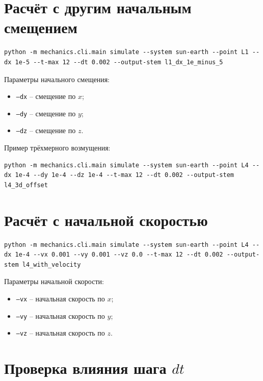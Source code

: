 \documentclass[a4paper,12pt]{article}
\begin{document}
\section{Расчёт с другим начальным смещением}

\begin{lstlisting}
python -m mechanics.cli.main simulate --system sun-earth --point L1 --dx 1e-5 --t-max 12 --dt 0.002 --output-stem l1_dx_1e_minus_5
\end{lstlisting}

Параметры начального смещения:

\begin{itemize}[leftmargin=1.2cm]
  \item \texttt{--dx} -- смещение по $x$;
  \item \texttt{--dy} -- смещение по $y$;
  \item \texttt{--dz} -- смещение по $z$.
\end{itemize}

Пример трёхмерного возмущения:

\begin{lstlisting}
python -m mechanics.cli.main simulate --system sun-earth --point L4 --dx 1e-4 --dy 1e-4 --dz 1e-4 --t-max 12 --dt 0.002 --output-stem l4_3d_offset
\end{lstlisting}

\section{Расчёт с начальной скоростью}

\begin{lstlisting}
python -m mechanics.cli.main simulate --system sun-earth --point L4 --dx 1e-4 --vx 0.001 --vy 0.001 --vz 0.0 --t-max 12 --dt 0.002 --output-stem l4_with_velocity
\end{lstlisting}

Параметры начальной скорости:

\begin{itemize}[leftmargin=1.2cm]
  \item \texttt{--vx} -- начальная скорость по $x$;
  \item \texttt{--vy} -- начальная скорость по $y$;
  \item \texttt{--vz} -- начальная скорость по $z$.
\end{itemize}

\section{Проверка влияния шага $dt$}
\end{document}
